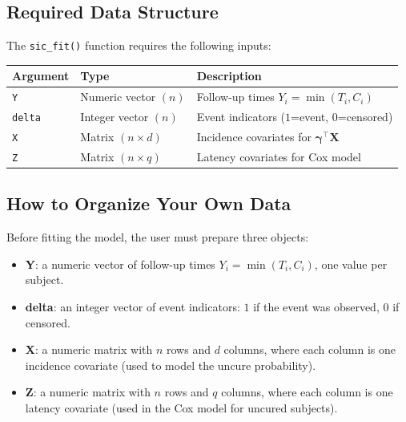 \documentclass[12pt,a4paper]{article}
\begin{document}
\subsection{Required Data Structure}

The \texttt{sic\_fit()} function requires the following inputs:

\begin{center}
\begin{tabular}{lll}
  \toprule
  \textbf{Argument} & \textbf{Type} & \textbf{Description} \\
  \midrule
  \texttt{Y}     & Numeric vector $(n)$ &
    Follow-up times $Y_i = \min(T_i, C_i)$ \\
  \texttt{delta} & Integer vector $(n)$ &
    Event indicators ($1$=event, $0$=censored) \\
  \texttt{X}     & Matrix $(n \times d)$ &
    Incidence covariates for $\boldsymbol{\gamma}^\top\mathbf{X}$ \\
  \texttt{Z}     & Matrix $(n \times q)$ &
    Latency covariates for Cox model \\
  \bottomrule
\end{tabular}
\end{center}

\subsection{How to Organize Your Own Data}

Before fitting the model, the user must prepare three
objects:

\begin{itemize}
  \item \textbf{Y}: a numeric vector of follow-up times
    $Y_i = \min(T_i, C_i)$, one value per subject.
  \item \textbf{delta}: an integer vector of event
    indicators: $1$ if the event was observed,
    $0$ if censored.
  \item \textbf{X}: a numeric matrix with $n$ rows and
    $d$ columns, where each column is one incidence
    covariate (used to model the uncure probability).
  \item \textbf{Z}: a numeric matrix with $n$ rows and
    $q$ columns, where each column is one latency
    covariate (used in the Cox model for uncured subjects).
\end{itemize}
\end{document}
